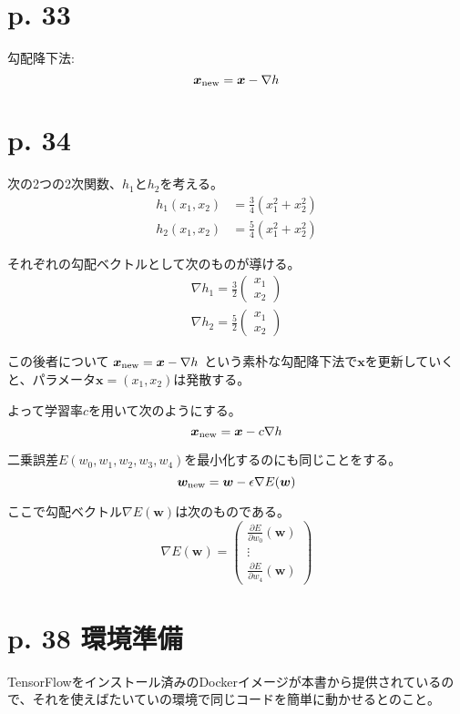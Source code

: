 \documentclass[uplatex,dvipdfmx]{jsarticle} \usepackage{amsmath,amssymb,bm}
\begin{document}
\section*{p. 33}
勾配降下法:
$$\bm{x}_{\rm new} = \bm{x}-\nabla h$$



\section*{p. 34}
次の2つの2次関数、$h_1$と$h_2$を考える。
\begin{align*}
h_1(x_1,x_2) &= \frac34(x_1^2+x_2^2) \\
h_2(x_1,x_2) &= \frac54(x_1^2+x_2^2)
\end{align*}

それぞれの勾配ベクトルとして次のものが導ける。
\begin{align*}
\nabla h_1 = \frac32
\begin{pmatrix}
x_1\\x_2
\end{pmatrix} \\
\nabla h_2 = \frac52
\begin{pmatrix}
x_1\\x_2
\end{pmatrix}
\end{align*}

この後者について
$\bm{x}_{\rm new} = \bm{x}-\nabla h$
という素朴な勾配降下法で$\bm{x}$を更新していくと、パラメータ$\bm{x} = (x_1,x_2)$は発散する。

よって学習率$c$を用いて次のようにする。
$$\bm{x}_{\rm new} = \bm{x}-c\nabla h$$


二乗誤差$E(w_0,w_1,w_2,w_3,w_4) $を最小化するのにも同じことをする。
$$\bm{w}_{\rm new} = \bm{w}-\epsilon\nabla E(\bm{w})$$

ここで勾配ベクトル$\nabla E(\bm{w})$は次のものである。
$$\nabla E(\bm{w}) =
\begin{pmatrix}
\frac{\partial E}{\partial w_0}(\bm{w}) \\
\vdots \\
\frac{\partial E}{\partial w_4}(\bm{w})
\end{pmatrix}$$


\section*{p. 38 環境準備}
TensorFlowをインストール済みのDockerイメージが本書から提供されているので、それを使えばたいていの環境で同じコードを簡単に動かせるとのこと。
\end{document}
